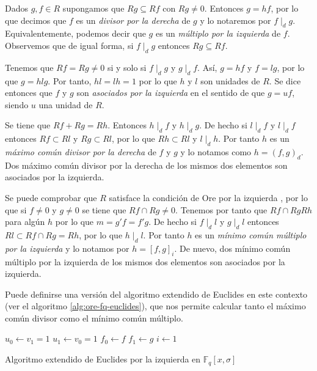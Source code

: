 Dados \(g, f \in R\) supongamos que \(Rg \subseteq Rf\) con \(Rg \neq 0\).
Entonces \(g = hf\), por lo que decimos que \(f\) es un \emph{divisor por la derecha} de \(g\) y lo notaremos por \(f \mid_{d} g\).
Equivalentemente, podemos decir que \(g\) es un \emph{múltiplo por la izquierda} de \(f\).
Observemos que de igual forma, si \(f \mid_{d} g\) entonces \(Rg \subseteq Rf\).

Tenemos que \(Rf = Rg \neq 0\) si y solo si \(f \mid_d g\) y \(g \mid_d f\).
Así, \(g = hf\) y \(f = lg\), por lo que \(g = hlg\).
Por tanto, \(hl = lh = 1\) por lo que \(h\) y \(l\) son unidades de \(R\).
Se dice entonces que \(f\) y \(g\) son \emph{asociados por la izquierda} en el sentido de que \(g = uf\), siendo \(u\) una unidad de \(R\).

Se tiene que \(Rf + Rg = Rh\).
Entonces \(h \mid_d f\) y \(h \mid_d g\).
De hecho si \(l \mid_d f\) y \(l \mid_d f\) entonces \(Rf \subset Rl\) y \(Rg \subset Rl\), por lo que \(Rh \subset Rl\) y \(l \mid_d h\).
Por tanto \(h\) es un \emph{máximo común divisor por la derecha} de \(f\) y \(g\) y lo notamos como \(h = (f, g)_d\).
Dos máximo común divisor por la derecha de los mismos dos elementos son asociados por la izquierda.

Se puede comprobar que \(R\) satisface la condición de Ore por la izquierda \parencite[ver][p. 4]{jacobson_finite-dimensional_1996}, por lo que si \(f \neq 0\) y \(g \neq 0\) se tiene que \(Rf \cap Rg \neq 0\).
Tenemos por tanto que \(Rf \cap Rg Rh\) para algún \(h\) por lo que \(m = g'f = f'g\).
De hecho si \(f \mid_d l\) y \(g \mid_d l\) entonces \(Rl \subset Rf \cap Rg = Rh\), por lo que \(h \mid_d l\).
Por tanto \(h\) es un \emph{mínimo común múltiplo por la izquierda} y lo notamos por \(h = [f, g]_i\).
De nuevo, dos mínimo común múltiplo por la izquierda de los mismos dos elementos son asociados por la izquierda.

Puede definirse una versión del algoritmo extendido de Euclides en este contexto (ver el algoritmo \ref{alg:ore-fq-euclides}), que nos permite calcular tanto el máximo común divisor como el mínimo común múltiplo.

\begin{Ualgorithm}[h]
  \DontPrintSemicolon
  \(u_0 \longleftarrow v_1 = 1\)\;
  \(u_1 \longleftarrow v_0 = 1\)\;
  \(f_0 \longleftarrow f\)\;
  \(f_1 \longleftarrow g\)\;
  \(i \longleftarrow 1\)\;
    \caption{Algoritmo extendido de Euclides por la izquierda en \(\mathbb F_q[x, \sigma]\)
  }
  \label{alg:ore-fq-euclides}
\end{Ualgorithm}
  
